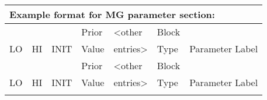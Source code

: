 \begin{center}

	\begin{longtable}{p{1.1cm} p{1.1cm} p{1.1cm}  p{1.7cm}  p{2cm}  p{1.6cm}  p{5cm}  }
		\multicolumn{7}{l}{Example format for MG parameter section:}\\
		\hline
		 &  &  & Prior &  <other & Block &  \\
		LO & HI & INIT & Value &  entries> & Type & Parameter Label \\
		\hline
		\endfirsthead

		\hline
		&  &  & Prior &  <other & Block &  \\
		LO & HI & INIT & Value &  entries> & Type & Parameter Label \\
		\hline
		\endhead

		\endfoot

		\endlastfoot


\end{longtable}
\end{center}
